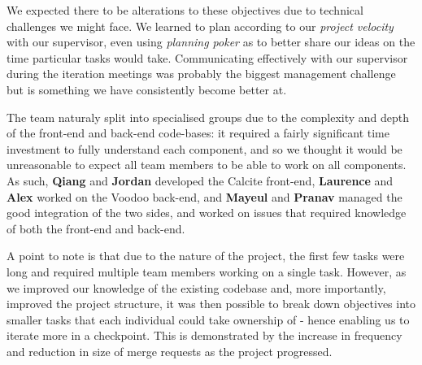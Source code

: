 We expected there to be alterations to these objectives due to technical challenges we might face. We learned to plan according to our \emph{project velocity} with our supervisor, even using \emph{planning poker} as to better share our ideas on the time particular tasks would take. Communicating effectively with our supervisor during the iteration meetings was probably the biggest management challenge but is something we have consistently become better at.

The team naturaly split into specialised groups due to the complexity and depth of the front-end and back-end code-bases: it required a fairly significant time investment to fully understand each component, and so we thought it would be unreasonable to expect all team members to be able to work on all components. As such, \textbf{Qiang} and \textbf{Jordan} developed the Calcite front-end, \textbf{Laurence} and \textbf{Alex} worked on the Voodoo back-end, and \textbf{Mayeul} and \textbf{Pranav} managed the good integration of the two sides, and worked on issues that required knowledge of both the front-end and back-end.

A point to note is that due to the nature of the project, the first few tasks were long and required multiple team members working on a single task. However, as we improved our knowledge of the existing codebase and, more importantly, improved the project structure, it was then possible to break down objectives into smaller tasks that each individual could take ownership of - hence enabling us to iterate more in a checkpoint. This is demonstrated by the increase in frequency and reduction in size of merge requests as the project progressed.
